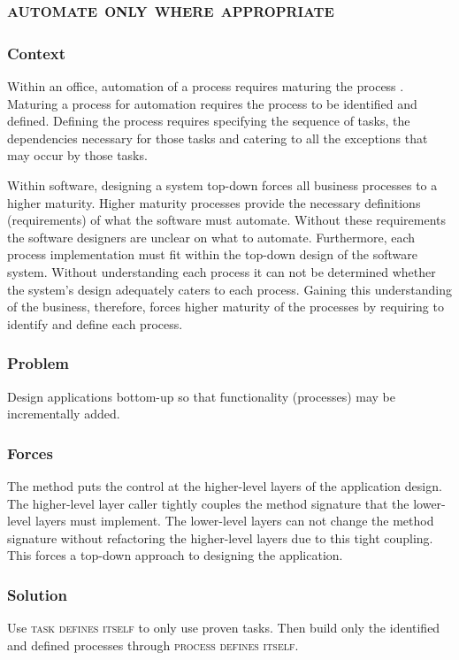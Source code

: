 \documentclass[prodmode]{style/acmlarge}
\begin{document}
\subsection{\textsc{\textbf{automate only where appropriate}}}

\subsubsection*{Context} Within an office, automation of a process requires
maturing the process \cite{process-maturity-global,bpm-tools}.  Maturing a
process for automation requires the process to be identified and defined. 
Defining the process requires specifying the sequence of tasks, the dependencies
necessary for those tasks and catering to all the exceptions that may occur by
those tasks.

Within software, designing a system top-down forces all business processes to a
higher maturity.  Higher maturity processes provide the necessary definitions
(requirements) of what the software must automate.  Without these requirements
the software designers are unclear on what to automate.  Furthermore, each
process implementation must fit within the top-down design of the software
system.  Without understanding each process it can not be determined whether
the system's design adequately caters to each process.  Gaining this
understanding of the business, therefore, forces higher maturity of the
processes by requiring to identify and define each process.

\subsubsection*{\textbf{Problem}} Design applications bottom-up so that
functionality (processes) may be incrementally added.

\subsubsection*{Forces} The method puts the control at the higher-level layers
of the application design.  The higher-level layer caller tightly couples the
method signature that the lower-level layers must implement.  The lower-level
layers can not change the method signature without refactoring the higher-level
layers due to this tight coupling.  This forces a top-down approach to designing
the application.

\subsubsection*{\textbf{Solution}} Use \textsc{task defines itself} to only use
proven tasks.  Then build only the identified and defined processes through
\textsc{process defines itself}.
\end{document}
